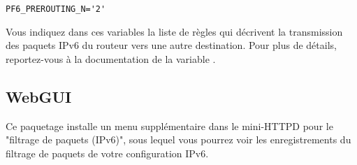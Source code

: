 \begin{description}
\verb*?PF6_PREROUTING_N='2'?

\mbox{}\newline
Vous indiquez dans ces variables la liste de règles qui décrivent la transmission
des paquets IPv6 du routeur vers une autre destination. Pour plus de détails,
reportez-vous à la documentation de la variable .

\end{description}

\subsection{WebGUI}

Ce paquetage installe un menu supplémentaire dans le mini-HTTPD pour le
"filtrage de paquets (IPv6)", sous lequel vous pourrez voir les enregistrements
du filtrage de paquets de votre configuration IPv6.
